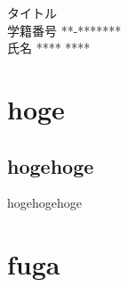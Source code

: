 \documentclass[11pt,dvipdfmx]{jarticle}
\begin{document}
\begin{center}
\vspace*{6mm}
{\Large タイトル}\\
\vspace*{4mm}
学籍番号 **-*******\\
氏名 **** ****
\end{center}

\tableofcontents

\section{hoge}
  \subsection{hogehoge}
    hogehogehoge

\section{fuga}
\end{document}
